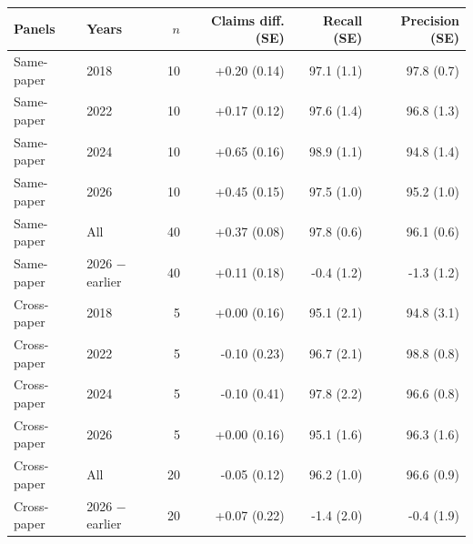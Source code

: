 \begin{tabular}{llrrrr}
\toprule
Panels & Years & $n$ & Claims diff. (SE) & Recall (SE) & Precision (SE) \\
\midrule
Same-paper & 2018 & 10 & +0.20 (0.14) & 97.1 (1.1) & 97.8 (0.7) \\
Same-paper & 2022 & 10 & +0.17 (0.12) & 97.6 (1.4) & 96.8 (1.3) \\
Same-paper & 2024 & 10 & +0.65 (0.16) & 98.9 (1.1) & 94.8 (1.4) \\
Same-paper & 2026 & 10 & +0.45 (0.15) & 97.5 (1.0) & 95.2 (1.0) \\
Same-paper & All & 40 & +0.37 (0.08) & 97.8 (0.6) & 96.1 (0.6) \\
Same-paper & 2026 $-$ earlier & 40 & +0.11 (0.18) & -0.4 (1.2) & -1.3 (1.2) \\
Cross-paper & 2018 & 5 & +0.00 (0.16) & 95.1 (2.1) & 94.8 (3.1) \\
Cross-paper & 2022 & 5 & -0.10 (0.23) & 96.7 (2.1) & 98.8 (0.8) \\
Cross-paper & 2024 & 5 & -0.10 (0.41) & 97.8 (2.2) & 96.6 (0.8) \\
Cross-paper & 2026 & 5 & +0.00 (0.16) & 95.1 (1.6) & 96.3 (1.6) \\
Cross-paper & All & 20 & -0.05 (0.12) & 96.2 (1.0) & 96.6 (0.9) \\
Cross-paper & 2026 $-$ earlier & 20 & +0.07 (0.22) & -1.4 (2.0) & -0.4 (1.9) \\
\bottomrule
\end{tabular}
